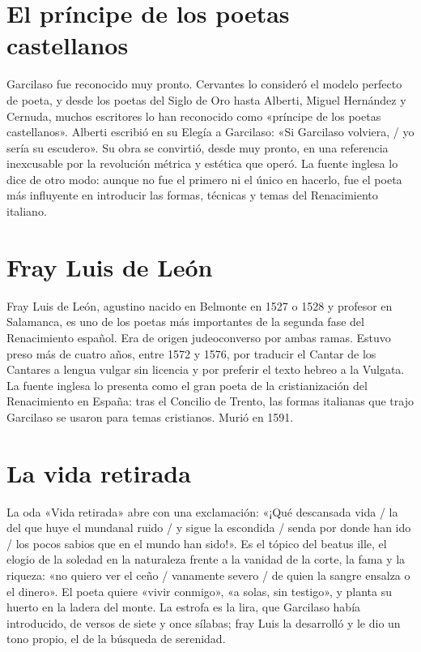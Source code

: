 \documentclass{book}
\begin{document}

\section{El príncipe de los poetas castellanos}

Garcilaso fue reconocido muy pronto. Cervantes lo consideró el modelo perfecto de poeta, y desde los poetas del Siglo de Oro hasta Alberti, Miguel Hernández y Cernuda, muchos escritores lo han reconocido como «príncipe de los poetas castellanos». Alberti escribió en su Elegía a Garcilaso: «Si Garcilaso volviera, / yo sería su escudero». Su obra se convirtió, desde muy pronto, en una referencia inexcusable por la revolución métrica y estética que operó. La fuente inglesa lo dice de otro modo: aunque no fue el primero ni el único en hacerlo, fue el poeta más influyente en introducir las formas, técnicas y temas del Renacimiento italiano.


\section{Fray Luis de León}

Fray Luis de León, agustino nacido en Belmonte en 1527 o 1528 y profesor en Salamanca, es uno de los poetas más importantes de la segunda fase del Renacimiento español. Era de origen judeoconverso por ambas ramas. Estuvo preso más de cuatro años, entre 1572 y 1576, por traducir el Cantar de los Cantares a lengua vulgar sin licencia y por preferir el texto hebreo a la Vulgata. La fuente inglesa lo presenta como el gran poeta de la cristianización del Renacimiento en España: tras el Concilio de Trento, las formas italianas que trajo Garcilaso se usaron para temas cristianos. Murió en 1591.


\section{La vida retirada}

La oda «Vida retirada» abre con una exclamación: «¡Qué descansada vida / la del que huye el mundanal ruido / y sigue la escondida / senda por donde han ido / los pocos sabios que en el mundo han sido!». Es el tópico del beatus ille, el elogio de la soledad en la naturaleza frente a la vanidad de la corte, la fama y la riqueza: «no quiero ver el ceño / vanamente severo / de quien la sangre ensalza o el dinero». El poeta quiere «vivir conmigo», «a solas, sin testigo», y planta su huerto en la ladera del monte. La estrofa es la lira, que Garcilaso había introducido, de versos de siete y once sílabas; fray Luis la desarrolló y le dio un tono propio, el de la búsqueda de serenidad.
\end{document}
